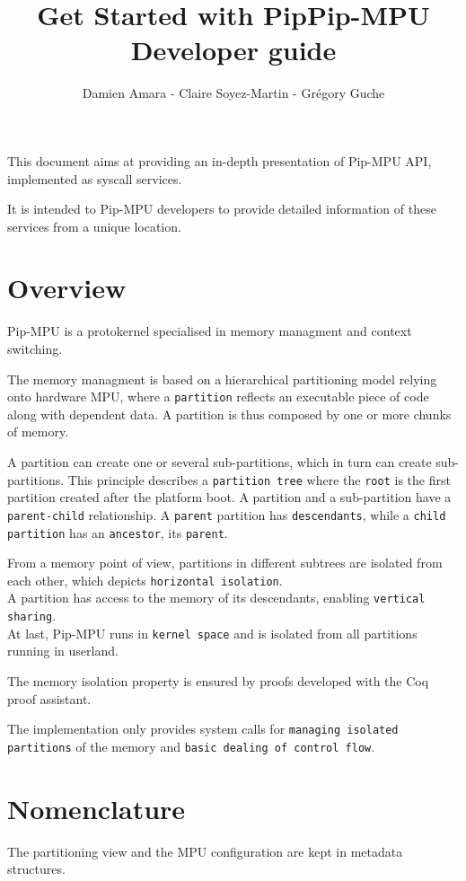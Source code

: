 \documentclass[10pt,a4paper,titlepage]{refart}
\title{Get Started with Pip}
\author{Damien Amara - Claire Soyez-Martin - Grégory Guche}
\title{Pip-MPU Developer guide}
\begin{document}
\maketitle
\tableofcontents
\pagebreak

This document aims at providing an in-depth presentation of Pip-MPU API, implemented as syscall services.

It is intended to Pip-MPU developers to provide detailed information of these services from a unique location.

\section{Overview}
Pip-MPU is a protokernel specialised in memory managment and context switching.

The memory managment is based on a hierarchical partitioning model relying onto hardware MPU, where a \texttt{partition} reflects an executable piece of code along with dependent data.
A partition is thus composed by one or more chunks of memory.

A partition can create one or several sub-partitions, which in turn can create sub-partitions.
This principle describes a \texttt{partition tree} where the \texttt{root} is the first partition created after the platform boot.
A partition and a sub-partition have a \texttt{parent-child} relationship.
A \texttt{parent} partition has \texttt{descendants}, while a \texttt{child partition} has an \texttt{ancestor}, its \texttt{parent}.

From a memory point of view, partitions in different subtrees are isolated from each other, which depicts \texttt{horizontal isolation}.\\
A partition has access to the memory of its descendants, enabling \texttt{vertical sharing}.\\
At last, Pip-MPU runs in \texttt{kernel space} and is isolated from all partitions running in userland.

The memory isolation property is ensured by proofs developed with the Coq proof assistant.

The implementation only provides system calls for \texttt{managing isolated partitions} of the memory and \texttt{basic dealing of control flow}.

\section{Nomenclature}
The partitioning view and the MPU configuration are kept in metadata structures.
\end{document}
